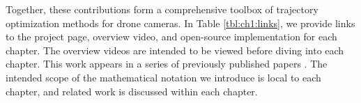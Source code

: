 \noindent Together, these contributions form a comprehensive toolbox of trajectory optimization methods for drone cameras.
In Table \ref{tbl:ch1:links}, we provide links to the project page, overview video, and open-source implementation for each chapter.
The overview videos are intended to be viewed before diving into each chapter.
This work appears in a series of previously published papers \cite{joubert:2015,roberts:2016,roberts:2017}.
The intended scope of the mathematical notation we introduce is local to each chapter, and related work is discussed within each chapter.
